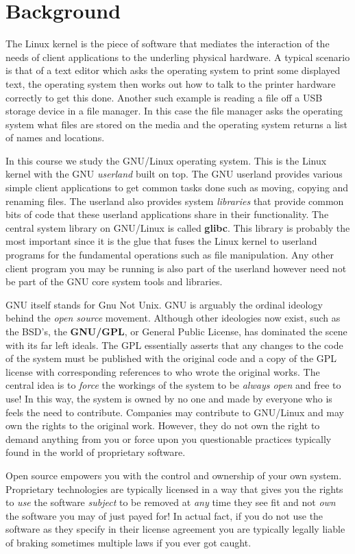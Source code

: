 
\section{Background} %
\label{sec:background}

The Linux kernel is the piece of software that mediates the interaction
of the needs of client applications to the underling physical hardware.
A typical scenario is that of a text editor which asks the operating system
to print some displayed text, the operating system then works out how to
talk to the printer hardware correctly to get this done. Another such
example is reading a file off a USB storage device in a file manager.
In this case the file manager asks the operating system what files are
stored on the media and the operating system returns a list of names
and locations.

In this course we study the GNU/Linux operating system. This is the
Linux kernel with the GNU \emph{userland} built on top. The GNU userland
provides various simple client applications to get common tasks done
such as moving, copying and renaming files. The userland also provides
system \emph{libraries} that provide common bits of code that these
userland applications share in their functionality. The central
system library on GNU/Linux is called \textbf{glibc}. This library
is probably the most important since it is the glue that fuses the
Linux kernel to userland programs for the fundamental operations such
as file manipulation. Any other client program you may be running is
also part of the userland however need not be part of the GNU core
system tools and libraries.

GNU itself stands for Gnu Not Unix. GNU is arguably the ordinal ideology
behind the \emph{open source} movement. Although other ideologies now
exist, such as the BSD's, the \textbf{GNU/GPL}, or General Public License,
has dominated the scene with its far left ideals. The GPL essentially
asserts that any changes to the code of the system must be published with
the original code and a copy of the GPL license with corresponding references
to who wrote the original works. The central idea is to \emph{force} the
workings of the system to be \emph{always open} and free to use! In this
way, the system is owned by no one and made by everyone who is feels the
need to contribute. Companies may contribute to GNU/Linux and may own the
rights to the original work. However, they do not own the right to demand
anything from you or force upon you questionable practices typically found
in the world of proprietary software.

Open source empowers you with the control and ownership of your own system.
Proprietary technologies are typically licensed in a way that gives you the
rights to \emph{use} the software \emph{subject} to be removed at \emph{any}
time they see fit and not \emph{own} the software you may of just payed for!
In actual fact, if you do not use the software as they specify in their
license agreement you are typically legally liable of braking sometimes
multiple laws if you ever got caught.
